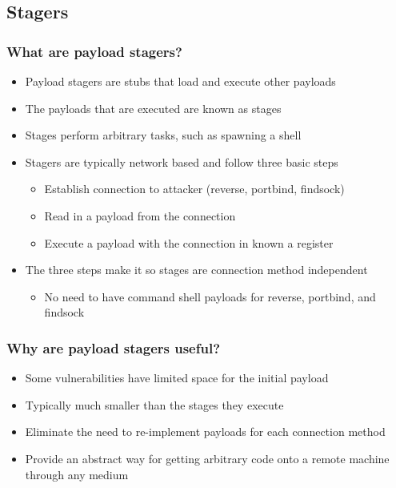\documentclass{beamer}
\newenvironment{sitemize}{\vspace{1mm}\begin{itemize}\itemsep 4pt\small}{\end{itemize}}
\begin{document}
\subsection{Stagers}
\begin{frame}[t]
    \frametitle{What are payload stagers?}

    \begin{sitemize}
        \item Payload stagers are stubs that load and execute other
        payloads
        \item The payloads that are executed are known as stages
        \item Stages perform arbitrary tasks, such as spawning a
        shell

        \pause
        \item Stagers are typically network based and follow three
        basic steps
        \begin{sitemize}
            \item Establish connection to attacker (reverse,
            portbind, findsock)
            \item Read in a payload from the connection
            \item Execute a payload with the connection in known a register
        \end{sitemize}

        \pause
        \item The three steps make it so stages are connection method
        independent
        \begin{sitemize}
            \item No need to have command shell payloads for
            reverse, portbind, and findsock
        \end{sitemize}
    \end{sitemize}
\end{frame}

\begin{frame}[t]
    \frametitle{Why are payload stagers useful?}

    \begin{sitemize}
        \item Some vulnerabilities have limited space for the
        initial payload

        \pause
        \item Typically much smaller than the stages
        they execute

        \pause
        \item Eliminate the need to re-implement payloads for each
        connection method

        \pause
        \item Provide an abstract way for getting arbitrary code
        onto a remote machine through any medium
    \end{sitemize}
\end{frame}
\end{document}

